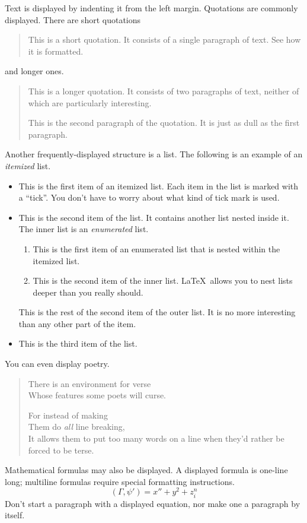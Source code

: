 \documentclass{article}      %
\newcommand{\ip}[2]{(#1, #2)}
\begin{document}
Text is displayed by indenting it from the left
margin.  Quotations are commonly displayed.  There
are short quotations
\begin{quote}
       This is a short quotation.  It consists of a
       single paragraph of text.  See how it is formatted.
\end{quote}
and longer ones.
\begin{quotation}
       This is a longer quotation.  It consists of two
       paragraphs of text, neither of which are
       particularly interesting.

       This is the second paragraph of the quotation.  It
       is just as dull as the first paragraph.
\end{quotation}
Another frequently-displayed structure is a list.
The following is an example of an \emph{itemized}
list.
\begin{itemize}
       \item This is the first item of an itemized list.
             Each item in the list is marked with a ``tick''.
             You don't have to worry about what kind of tick
             mark is used.

       \item This is the second item of the list.  It
             contains another list nested inside it.  The inner
             list is an \emph{enumerated} list.
             \begin{enumerate}
                    \item This is the first item of an enumerated
                          list that is nested within the itemized list.

                    \item This is the second item of the inner list.
                          \LaTeX\ allows you to nest lists deeper than
                          you really should.
             \end{enumerate}
             This is the rest of the second item of the outer
             list.  It is no more interesting than any other
             part of the item.
       \item This is the third item of the list.
\end{itemize}
You can even display poetry.
\begin{verse}
       There is an environment
       for verse \\             %
       Whose features some poets %
       will curse.


       For instead of making\\
       Them do \emph{all} line breaking, \\
       It allows them to put too many words on a line when they'd rather be
       forced to be terse.
\end{verse}

Mathematical formulas may also be displayed.  A
displayed formula
is
one-line long; multiline
formulas require special formatting instructions.
\[  \ip{\Gamma}{\psi'} = x'' + y^{2} + z_{i}^{n}\]
Don't start a paragraph with a displayed equation,
nor make one a paragraph by itself.
\end{document}
